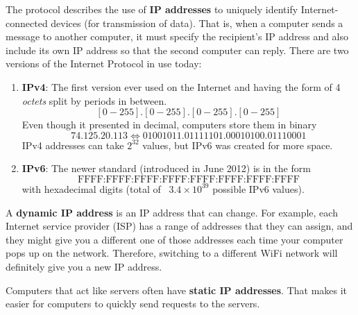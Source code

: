 \documentclass{article}
\begin{document}
  \begin{definition}
  The protocol describes the use of \textbf{IP addresses} to uniquely identify Internet-connected devices (for transmission of data). That is, when a computer sends a message to another computer, it must specify the recipient's IP address and also include its own IP address so that the second computer can reply. There are two versions of the Internet Protocol in use today: 
  \begin{enumerate}
      \item \textbf{IPv4}: The first version ever used on the Internet and having the form of 4 \textit{octets} split by periods in between. 
      \[[0-255].[0-255].[0-255].[0-255]\]
      Even though it presented in decimal, computers store them in binary 
      \[74.125.20.113 \iff 01001011.01111101.00010100.01110001\]
      IPv4 addresses can take $2^{32}$ values, but IPv6 was created for more space.
      \item \textbf{IPv6}: The newer standard (introduced in June 2012) is in the form 
      \[\text{FFFF:FFFF:FFFF:FFFF:FFFF:FFFF:FFFF:FFFF}\]
      with hexadecimal digits (total of ~$3.4 \times 10^{39}$ possible IPv6 values). 
  \end{enumerate}
  \end{definition}

  \begin{definition}
  A \textbf{dynamic IP address} is an IP address that can change. For example, each Internet service provider (ISP) has a range of addresses that they can assign, and they might give you a different one of those addresses each time your computer pops up on the network. Therefore, switching to a different WiFi network will definitely give you a new IP address. 

  Computers that act like servers often have \textbf{static IP addresses}. That makes it easier for computers to quickly send requests to the servers. 
  \end{definition}
\end{document}
